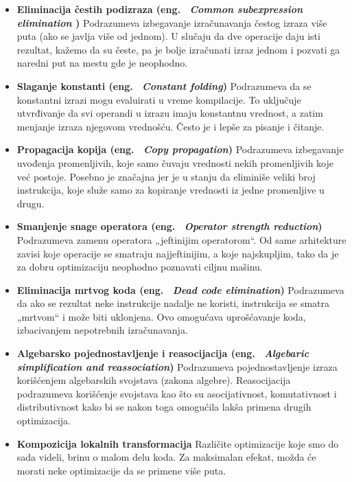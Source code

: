 \documentclass[a4paper]{article}
\begin{document}
\begin{itemize}
  \item \textbf{Eliminacija čestih podizraza (eng. ~{\em Common subexpression elimination} )} \newline
  Podrazumeva izbegavanje izračunavanja čestog izraza više puta (ako se javlja više od jednom). 
  U slučaju da dve operacije daju isti rezu\-ltat, kažemo da su česte, pa je bolje izračunati izraz jednom i pozvati ga naredni put na mestu gde je neophodno.

  \item \textbf{Slaganje konstanti (eng. ~{\em Constant folding})} \newline
  Podrazumeva da se konstantni izrazi mogu evaluirati u vreme kompilacije. To uključuje utvrđivanje da svi operandi u izrazu imaju konstantnu vrednost, a zatim menjanje izraza njegovom vrednošću.
  Često je i lepše za pisanje i čitanje. 
  \item \textbf{Propagacija kopija (eng. ~{\em Copy propagation})} \newline
  Podrazumeva izbegavanje uvođenja promenljivih, koje samo čuvaju vrednosti nekih promenljivih koje već postoje.
  Posebno je značajna jer je u stanju da eliminiše veliki broj instrukcija, koje služe samo za kopiranje vrednosti iz jedne promenljive u drugu.
  \item \textbf{Smanjenje snage operatora (eng. ~{\em Operator strength reduction})} \newline
  Podrazumeva zamenu operatora „jeftinijim operatorom“. 
  Od same arhitekture zavisi koje operacije se smatraju najjeftinijim, a koje najskupljim, tako da je za dobru optimizaciju neophodno poznavati ciljnu mašinu.
  \item \textbf{Eliminacija mrtvog koda (eng. ~{\em Dead code elimination})} \newline
  Podrazumeva da ako se rezultat neke instrukcije nadalje ne koristi, instrukcija se smatra „mrtvom“ i može biti uklonjena. 
  Ovo omogućava uprošćavanje koda, izbacivanjem nepotrebnih izračunavanja.
  \item \textbf{Algebarsko pojednostavljenje i reasocijacija (eng. ~{\em Algebaric simplification and reassociation})} \newline
  Podrazumeva pojednostavljenje izraza korišćenjem algebarskih svojstava (zakona algebre). Reasocijacija podrazumeva korišćenje svojstava kao što su asocijativnost, komutativnost i distributivnost kako bi se nakon toga omogućila lakša primena drugih optimizacija.
  \item \textbf{Kompozicija lokalnih transformacija} \newline
  Različite optimizacije koje smo do sada videli, brinu o malom delu koda. 
  Za maksimalan efekat, možda će morati neke optimizacije da se primene više puta.  \cite{fogOptimizacije}

\end{itemize}
\end{document}
